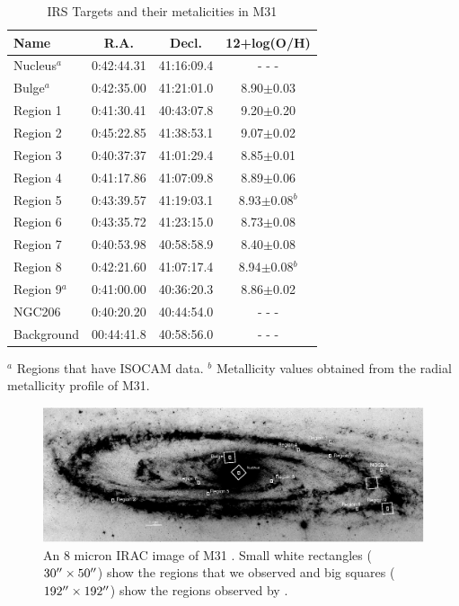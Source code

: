 \begin{table}
 \centering
 \begin{minipage}{70mm}
\caption{IRS Targets and their metalicities in M31\label{regions}}
  \begin{tabular}{lccc}
  \hline Name & R.A. & Decl. &12+log(O/H)
   \\
 \hline
 Nucleus$^a$&0:42:44.31&41:16:09.4& - - -\\
Bulge$^a$&0:42:35.00&41:21:01.0&8.90$\pm$0.03\\
Region 1&0:41:30.41&40:43:07.8&9.20$\pm$0.20\\
Region 2&0:45:22.85&41:38:53.1&9.07$\pm$0.02\\
Region 3&0:40:37:37&41:01:29.4&8.85$\pm$0.01\\
Region 4&0:41:17.86&41:07:09.8&8.89$\pm$0.06\\
Region 5&0:43:39.57&41:19:03.1&\hspace{0.14cm}8.93$\pm$0.08$^b$\\
Region 6&0:43:35.72&41:23:15.0&8.73$\pm$0.08\\
Region 7&0:40:53.98&40:58:58.9&8.40$\pm$0.08\\
Region 8&0:42:21.60&41:07:17.4&\hspace{0.14cm}8.94$\pm$0.08$^b$\\
Region 9$^a$&0:41:00.00&40:36:20.3&8.86$\pm$0.02\\
NGC206&0:40:20.20&40:44:54.0& - - -\\
Background&00:44:41.8&40:58:56.0& - - -\\
\hline
\end{tabular}
{$^a$ Regions that have ISOCAM data. $^b$ Metallicity values obtained from the radial metallicity profile of M31.}
\end{minipage}
\end{table}



\begin{figure}

\centering
\includegraphics[scale=0.9]{./m31_map.eps}
\caption{An 8 micron IRAC image of M31 \citep{Barmby2006lr}. Small white rectangles ($30\hbox{$^{\prime\prime}$}\times50\hbox{$^{\prime\prime}$}$) show the regions that we observed and big squares ($192\hbox{$^{\prime\prime}$}\times192\hbox{$^{\prime\prime}$}$) show the regions observed by \citet{1998Cesarsky}.}
\label{m31}
\end{figure}


